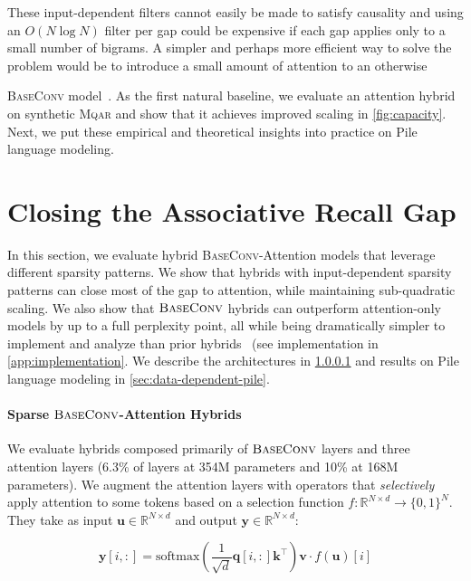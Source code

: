 These input-dependent filters cannot easily be made to satisfy causality and using an $O(N \log N)$ filter per gap could be expensive if each gap applies only to a small number of bigrams. A simpler and perhaps more efficient way to solve the problem would be to introduce a small amount of attention to an otherwise {\textsc{BaseConv} model~\citep{dao2022hungry}. As the first natural baseline, we evaluate an attention hybrid on synthetic {\textsc{Mqar}} and show that it achieves improved scaling in \ref{fig:capacity}. Next, we put these empirical and theoretical insights into practice on Pile language modeling.

\section{Closing the Associative Recall Gap}

\label{sec:sec5-method}

In this section, we evaluate hybrid \textsc{BaseConv}-Attention models that leverage different sparsity patterns. We show that hybrids with input-dependent sparsity patterns can close most of the gap to attention, while maintaining sub-quadratic scaling. We also show that ${\textsc{BaseConv}}$ hybrids can outperform attention-only models by up to a full perplexity point, all while being dramatically simpler to implement and analyze than prior hybrids~\citep{dao2022hungry} (see implementation in \ref{app:implementation}. 
We describe the architectures in \ref{sec:method-arch} and results on Pile language modeling in  \ref{sec:data-dependent-pile}.

\paragraph{Sparse ${\textsc{BaseConv}}$-Attention Hybrids}
\label{sec:method-arch}
We evaluate hybrids composed primarily of ${\textsc{BaseConv}}$ layers and three attention layers (6.3\% of layers at 354M parameters and 10\% at 168M parameters). We augment the attention layers with operators that \textit{selectively} apply attention to some tokens based on a selection function $f:\mathbb{R}^{N\times d} \rightarrow \{0,1\}^N$. They take as input $\bm{u} \in \mathbb{R}^{N \times d}$ and output $\bm{y} \in \mathbb{R}^{N \times d}$:

\begin{equation}
    \label{eq:selective}
    \bm{y}[i, :] = \mathrm{softmax}(\frac{1}{\sqrt{d}}\bm{q}[i, :]\bm{k}^\top)\bm{v} \cdot f(\bm{u})[i] 
\end{equation}

}
